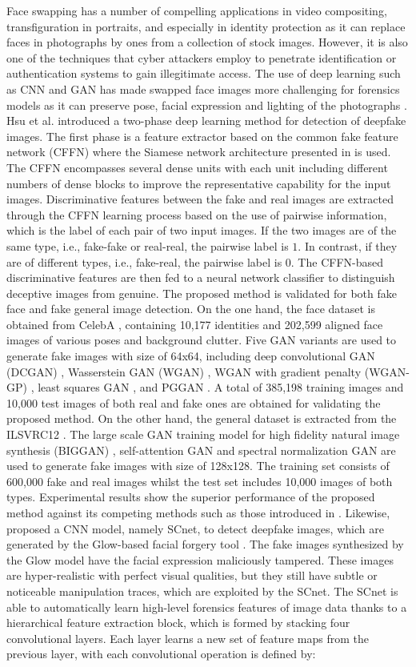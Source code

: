 Face swapping has a number of compelling applications in video compositing, transfiguration in portraits, and especially in identity protection as it can replace faces in photographs by ones from a collection of stock images. However, it is also one of the techniques that cyber attackers employ to penetrate identification or authentication systems to gain illegitimate access. The use of deep learning such as CNN and GAN has made swapped face images more challenging for forensics models as it can preserve pose, facial expression and lighting of the photographs .
Hsu et al.  introduced a two-phase deep learning method for detection of deepfake images. The first phase is a feature extractor based on the common fake feature network (CFFN) where the Siamese network architecture presented in  is used. The CFFN encompasses several dense units with each unit including different numbers of dense blocks  to improve the representative capability for the input images. 
Discriminative features between the fake and real images are extracted through the CFFN learning process based on the use of pairwise information, which is the label of each pair of two input images. If the two images are of the same type, i.e., fake-fake or real-real, the pairwise label is $1$. In contrast, if they are of different types, i.e., fake-real, the pairwise label is $0$. The CFFN-based discriminative features are then fed to a neural network classifier to distinguish deceptive images from genuine. The proposed method is validated for both fake face and fake general image detection. On the one hand, the face dataset is obtained from CelebA , containing 10,177 identities and 202,599 aligned face images of various poses and background clutter. Five GAN variants are used to generate fake images with size of 64x64, including deep convolutional GAN (DCGAN) , Wasserstein GAN (WGAN) , WGAN with gradient penalty (WGAN-GP) , least squares GAN , and PGGAN . A total of 385,198 training images and 10,000 test images of both real and fake ones are obtained for validating the proposed method. On the other hand, the general dataset is extracted from the ILSVRC12 . The large scale GAN training model for high fidelity natural image synthesis (BIGGAN) , self-attention GAN  and spectral normalization GAN  are used to generate fake images with size of 128x128. The training set consists of 600,000 fake and real images whilst the test set includes 10,000 images of both types. Experimental results show the superior performance of the proposed method against its competing methods such as those introduced in .
Likewise,  proposed a CNN model, namely SCnet, to detect deepfake images, which are generated by the Glow-based facial forgery tool . The fake images synthesized by the Glow model  have the facial expression maliciously tampered. These images are hyper-realistic with perfect visual qualities, but they still have subtle or noticeable manipulation traces, which are exploited by the SCnet. The SCnet is able to automatically learn high-level forensics features of image data thanks to a hierarchical feature extraction block, which is formed by stacking four convolutional layers. Each layer learns a new set of feature maps from the previous layer, with each convolutional operation is defined by:

